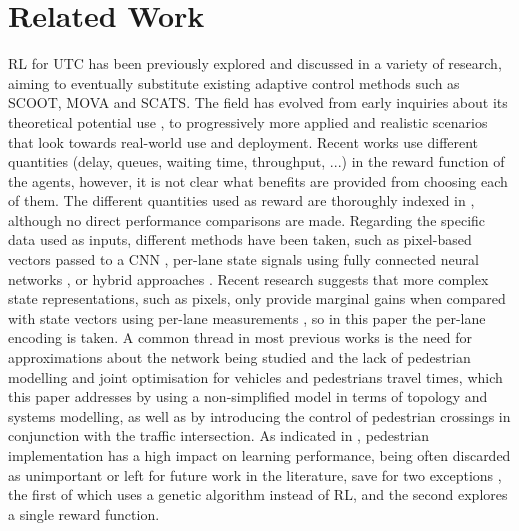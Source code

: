 \documentclass[a4paper, conference]{IEEEtran}
\begin{document}
\section{Related Work}
\label{lit}
RL for UTC has been previously explored and discussed in a variety of research, aiming to eventually substitute existing adaptive control methods such as SCOOT\cite{scoot}, MOVA\cite{mova} and SCATS\cite{scats}.
The field has evolved from early inquiries about its theoretical potential use \cite{wiering2000} \cite{abdul2003} \cite{pra2010} \cite{abdulhai2010} \cite{abdoos2011}, to progressively more applied and realistic scenarios that look towards real-world use and deployment.
Recent works use different quantities (delay, queues, waiting time, throughput, ...) in the reward function of the agents, however, it is not clear what benefits are provided from choosing each of them.
The different quantities used as reward are thoroughly indexed in \cite{yau} \cite{survey2020} \cite{survey2020wei}, although no direct performance comparisons are made.
Regarding the specific data used as inputs, different methods have been taken, such as pixel-based vectors passed to a CNN \cite{liang2017} \cite{gao2017} \cite{mousavi2017}, per-lane state signals using fully connected neural networks \cite{survey2014} \cite{aslani2019} \cite{genders2019}, or hybrid approaches \cite{genders2016} \cite{gendersthesis} \cite{wan2018}.
Recent research suggests that more complex state representations, such as pixels, only provide marginal gains when compared with state vectors using per-lane measurements \cite{gendersstate}, so in this paper the per-lane encoding is taken.
A common thread in most previous works is the need for approximations about the network being studied and the lack of pedestrian modelling and joint optimisation for vehicles and pedestrians travel times, which this paper addresses by using a non-simplified model in terms of topology and systems modelling, as well as by introducing the control of pedestrian crossings in conjunction with the traffic intersection.
As indicated in \cite{survey2020}, pedestrian implementation has a high impact on learning performance, being often discarded as unimportant or left for future work in the literature, save for two exceptions \cite{geneticped} \cite{liu2017}, the first of which uses a genetic algorithm instead of RL, and the second explores a single reward function.
\end{document}

